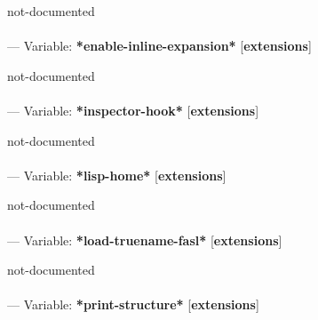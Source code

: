 \begin{adjustwidth}{5em}{5em}
not-documented
\end{adjustwidth}

\paragraph{}
\label{EXTENSIONS:*ENABLE-INLINE-EXPANSION*}
--- Variable: \textbf{*enable-inline-expansion*} [\textbf{extensions}] \textit{}

\begin{adjustwidth}{5em}{5em}
not-documented
\end{adjustwidth}

\paragraph{}
\label{EXTENSIONS:*INSPECTOR-HOOK*}
--- Variable: \textbf{*inspector-hook*} [\textbf{extensions}] \textit{}

\begin{adjustwidth}{5em}{5em}
not-documented
\end{adjustwidth}

\paragraph{}
\label{EXTENSIONS:*LISP-HOME*}
--- Variable: \textbf{*lisp-home*} [\textbf{extensions}] \textit{}

\begin{adjustwidth}{5em}{5em}
not-documented
\end{adjustwidth}

\paragraph{}
\label{EXTENSIONS:*LOAD-TRUENAME-FASL*}
--- Variable: \textbf{*load-truename-fasl*} [\textbf{extensions}] \textit{}

\begin{adjustwidth}{5em}{5em}
not-documented
\end{adjustwidth}

\paragraph{}
\label{EXTENSIONS:*PRINT-STRUCTURE*}
--- Variable: \textbf{*print-structure*} [\textbf{extensions}] \textit{}

